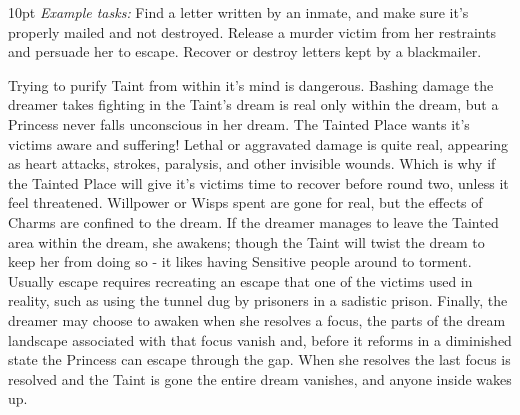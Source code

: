  \begin{myindentpar}{10pt}   \emph{Example tasks:} Find a letter written by an inmate, and make sure it's properly mailed and not destroyed. Release a murder victim from her restraints and persuade her to escape. Recover or destroy letters kept by a blackmailer.\end{myindentpar}

\noindent Trying to purify Taint from within it's mind is dangerous. Bashing damage the dreamer takes fighting in the Taint's dream is real only within the dream, but a Princess never falls unconscious in her dream. The Tainted Place wants it's victims aware and suffering! Lethal or aggravated damage is quite real, appearing as heart attacks, strokes, paralysis, and other invisible wounds. Which is why if the Tainted Place will give it's victims time to recover before round two, unless it feel threatened. Willpower or Wisps spent are gone for real, but the effects of Charms are confined to the dream. If the dreamer manages to leave the Tainted area within the dream, she awakens; though the Taint will twist the dream to keep her from doing so - it likes having Sensitive people around to torment. Usually escape requires recreating an escape that one of the victims used in reality, such as using the tunnel dug by prisoners in a sadistic prison. Finally, the dreamer may choose to awaken when she resolves a focus,
 the parts of the dream landscape associated with that focus vanish and, before it reforms in a diminished 
state the Princess can escape through the gap. When she resolves the last focus is resolved and the Taint is gone the entire dream vanishes, and anyone inside wakes up.


